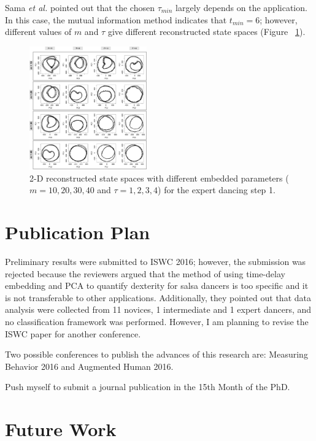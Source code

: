 \documentclass[10pt,journal,compsoc]{IEEEtran}
\begin{document}
Sama \emph{et al.} \cite{Sama2013} pointed out that
the chosen $\tau_{min}$ largely depends on the application.
In this case, the mutual information method indicates that $t_{min} =  6$;
however, different values of $m$ and $\tau$ give different 
reconstructed state spaces (Figure ~\ref{fig:takens_problem}).

\begin{figure}[htbp!] 
\centering    
\includegraphics[width=0.45\textwidth]{takens}
\caption[PA]{2-D reconstructed state spaces with different embedded parameters ($m=10,20,30,40$ and $\tau= 1,2,3,4$)
for the expert dancing step 1.}
\label{fig:takens_problem}
\end{figure}

\section{Publication Plan}
Preliminary results were submitted to ISWC 2016; however, the 
submission was rejected because the reviewers argued that 
the method of using time-delay embedding and PCA
to quantify dexterity for salsa dancers is too specific and
it is not transferable to other applications. Additionally, 
they pointed out that 
data analysis were collected from 11 novices, 1 intermediate and 1 expert dancers,
and no classification framework was performed. 
However, I am planning to revise the ISWC paper for another conference.

Two possible conferences to publish the advances of this research are:
Measuring Behavior 2016 and Augmented Human 2016.

Push myself to submit a journal publication in the 15th Month of the PhD.


\section{Future Work} 
\end{document}
